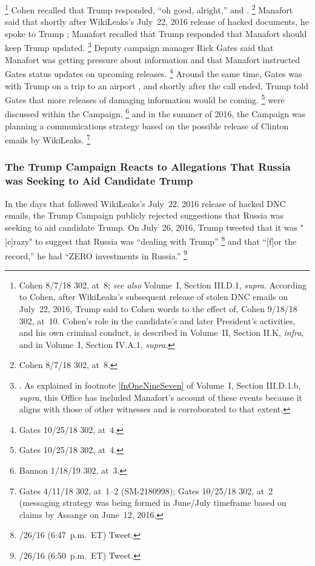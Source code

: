 \footnote{Cohen 8/7/18 302, at~8;
\textit{see also} Volume~I, Section III.D.1, \textit{supra}.
According to Cohen, after WikiLeaks's subsequent release of stolen DNC emails on July~22, 2016, Trump said to Cohen words to the effect of, 
Cohen 9/18/18 302, at~10.
Cohen's role in the candidate's and later President's activities, and his own criminal conduct, is described in Volume~II, Section II.K, \textit{infra}, and in Volume~I, Section IV.A.1, \textit{supra}.}
Cohen recalled that Trump responded, ``oh good, alright,'' and .%
\footnote{Cohen 8/7/18 302, at~8.}
Manafort said that shortly after WikiLeaks's July~22, 2016 release of hacked documents, he spoke to Trump ; Manafort recalled that Trump responded that Manafort should  keep Trump updated.%
\footnote{.
As explained in footnote \ref{fnOneNineSeven} of Volume~I, Section III.D.1.b, \textit{supra}, this Office has included Manafort's account of these events because it aligns with those of other witnesses and is corroborated to that extent.}
Deputy campaign manager Rick Gates said that Manafort was getting pressure about  information and that Manafort instructed Gates  status updates on upcoming releases.%
\footnote{Gates 10/25/18 302, at~4.}
Around the same time, Gates was with Trump on a trip to an airport , and shortly after the call ended, Trump told Gates that more releases of damaging information would be coming.%
\footnote{Gates 10/25/18 302, at~4.}
 were discussed within the Campaign,%
\footnote{Bannon 1/18/19 302, at~3.}
and in the summer of 2016, the Campaign was planning a communications strategy based on the possible release of Clinton emails by WikiLeaks.%
\footnote{Gates 4/11/18 302, at~1--2 (SM-2180998);
Gates 10/25/18 302, at~2 (messaging strategy was being formed in June/July timeframe based on claims by Assange on June~12, 2016, }

\subsubsection{The Trump Campaign Reacts to Allegations That Russia was Seeking to Aid Candidate Trump}
In the days that followed WikiLeaks's July~22, 2016 release of hacked DNC emails, the Trump Campaign publicly rejected suggestions that Russia was seeking to aid candidate Trump.
On July~26, 2016, Trump tweeted that it was "[c]razy" to suggest that Russia was ``dealing with Trump''%
\footnote{/26/16 (6:47~p.m.~ET) Tweet.}
and that ``[f]or the record,'' he had ``ZERO investments in Russia.''%
\footnote{/26/16 (6:50~p.m.~ET) Tweet.}

